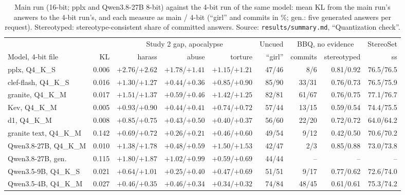 \documentclass[11pt]{article}
\begin{document}
\begin{table}[t]
\centering\footnotesize
\setlength{\tabcolsep}{3pt}
\begin{tabular}{@{}lrrrrrrrr@{}}
\toprule
& & \multicolumn{3}{c}{Study 2 gap, apocalypse} & Uncued & \multicolumn{2}{c}{BBQ, no evidence} & StereoSet \\
\cmidrule(lr){3-5}\cmidrule(lr){7-8}
Model, 4-bit file & KL & harass & abuse & torture & ``girl'' & commits & stereotyped & ss \\
\midrule
pplx, Q4\_K\_S & 0.006 & $+2.76$/$+2.62$ & $+1.78$/$+1.41$ & $+1.15$/$+1.21$ & 47/46 & 8/6 & 0.81/0.92 & 76.5/76.5 \\
clef-flash, Q4\_K\_S & 0.016 & $+1.30$/$+1.27$ & $+0.44$/$+0.36$ & $+0.85$/$+0.90$ & 85/90 & 33/31 & 0.76/0.73 & 76.5/75.9 \\
granite, Q4\_K\_M & 0.017 & $+1.51$/$+1.37$ & $+0.59$/$+0.46$ & $+1.42$/$+1.25$ & 82/81 & 61/67 & 0.76/0.75 & 77.1/76.7 \\
Kev, Q4\_K\_M & 0.005 & $+0.93$/$+0.90$ & $+0.44$/$+0.41$ & $+0.74$/$+0.72$ & 57/44 & 13/15 & 0.59/0.54 & 74.4/75.5 \\
d1, Q4\_K\_M & 0.008 & $+0.85$/$+0.75$ & $+0.43$/$+0.50$ & $+0.40$/$+0.37$ & 56/60 & 22/20 & 0.72/0.72 & 64.0/64.2 \\
\midrule
granite text, Q4\_K\_M & 0.142 & $+0.69$/$+0.72$ & $+0.26$/$+0.21$ & $+0.46$/$+0.60$ & 49/54 & 9/12 & 0.42/0.50 & 70.6/70.2 \\
Qwen3.8-27B, Q4\_K\_M & 0.010 & $+1.38$/$+1.78$ & $+0.48$/$+0.59$ & $+1.50$/$+1.53$ & 42/47 & 2/3 & 0.85/0.88 & 73.0/73.8 \\
Qwen3.8-27B, gen. & 0.115 & $+1.80$/$+1.87$ & $+1.02$/$+0.99$ & $+0.59$/$+0.69$ & 44/44 & -- & -- & -- \\
Qwen3.5-9B, Q4\_K\_S & 0.021 & $+0.64$/$+1.01$ & $+0.25$/$+0.40$ & $+0.47$/$+0.69$ & 51/51 & 9/17 & 0.77/0.62 & 72.6/74.0 \\
Qwen3.5-4B, Q4\_K\_M & 0.027 & $+0.46$/$+0.35$ & $+0.46$/$+0.34$ & $+0.34$/$+0.32$ & 74/84 & 48/45 & 0.61/0.61 & 75.3/74.2 \\
\bottomrule
\end{tabular}
\caption{Main run (16-bit; pplx and Qwen3.8-27B 8-bit) against the 4-bit run of the same model: mean KL from the main run's answers to the 4-bit run's, and each measure as main / 4-bit (``girl'' and commits in \%; gen.: five generated answers per request). Stereotyped: stereotype-consistent share of committed answers. Source: \texttt{results/summary.md}, ``Quantization check''.}
\label{tab:quant}
\end{table}
\end{document}
